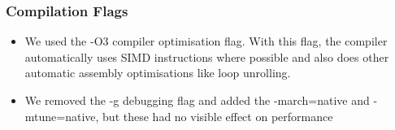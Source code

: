 \begin{frame}
  \frametitle{Compilation Flags}
    \begin{itemize}
        \item We used the -O3 compiler optimisation flag. With this flag, the compiler automatically uses SIMD instructions where possible and also does other automatic assembly optimisations like loop unrolling.
        \item We removed the -g debugging flag and added the -march=native and -mtune=native, but these had no visible effect on performance
    \end{itemize}
\end{frame}


